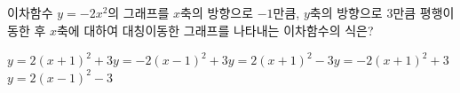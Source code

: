 이차함수 $y=-2x^2$의 그래프를 $x$축의 방향으로 $-1$만큼, $y$축의 방향으로 $3$만큼 평행이동한 후 $x$축에 대하여 대칭이동한 그래프를 나타내는 이차함수의 식은?
\begin{choicesii}{$y=2(x+1)^2+3$}{$y=-2(x-1)^2+3$}{$y=2(x+1)^2-3$}{$y=-2(x+1)^2+3$}{$y=2(x-1)^2-3$}\end{choicesii}
